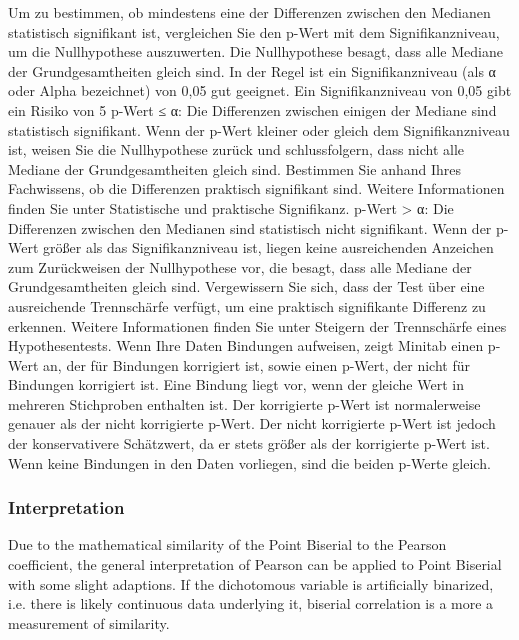 \documentclass[a4paper,12pt]{report}
\begin{document}
Um zu bestimmen, ob mindestens eine der Differenzen zwischen den Medianen statistisch signifikant ist, vergleichen Sie den p-Wert mit dem Signifikanzniveau, um die Nullhypothese auszuwerten. Die Nullhypothese besagt, dass alle Mediane der Grundgesamtheiten gleich sind. In der Regel ist ein Signifikanzniveau (als α oder Alpha bezeichnet) von 0,05 gut geeignet. Ein Signifikanzniveau von 0,05 gibt ein Risiko von 5 %
p-Wert ≤ α: Die Differenzen zwischen einigen der Mediane sind statistisch signifikant.
Wenn der p-Wert kleiner oder gleich dem Signifikanzniveau ist, weisen Sie die Nullhypothese zurück und schlussfolgern, dass nicht alle Mediane der Grundgesamtheiten gleich sind. Bestimmen Sie anhand Ihres Fachwissens, ob die Differenzen praktisch signifikant sind. Weitere Informationen finden Sie unter Statistische und praktische Signifikanz.
p-Wert > α: Die Differenzen zwischen den Medianen sind statistisch nicht signifikant.
Wenn der p-Wert größer als das Signifikanzniveau ist, liegen keine ausreichenden Anzeichen zum Zurückweisen der Nullhypothese vor, die besagt, dass alle Mediane der Grundgesamtheiten gleich sind. Vergewissern Sie sich, dass der Test über eine ausreichende Trennschärfe verfügt, um eine praktisch signifikante Differenz zu erkennen. Weitere Informationen finden Sie unter Steigern der Trennschärfe eines Hypothesentests.
Wenn Ihre Daten Bindungen aufweisen, zeigt Minitab einen p-Wert an, der für Bindungen korrigiert ist, sowie einen p-Wert, der nicht für Bindungen korrigiert ist. Eine Bindung liegt vor, wenn der gleiche Wert in mehreren Stichproben enthalten ist. Der korrigierte p-Wert ist normalerweise genauer als der nicht korrigierte p-Wert. Der nicht korrigierte p-Wert ist jedoch der konservativere Schätzwert, da er stets größer als der korrigierte p-Wert ist. Wenn keine Bindungen in den Daten vorliegen, sind die beiden p-Werte gleich.

\subsubsection{Interpretation}

Due to the mathematical similarity of the Point Biserial to the Pearson coefficient, the general interpretation of Pearson can be applied to Point Biserial with some slight adaptions. If the dichotomous variable is artificially binarized, i.e. there is likely continuous data underlying it, biserial correlation is a more a measurement of similarity.
\end{document}
